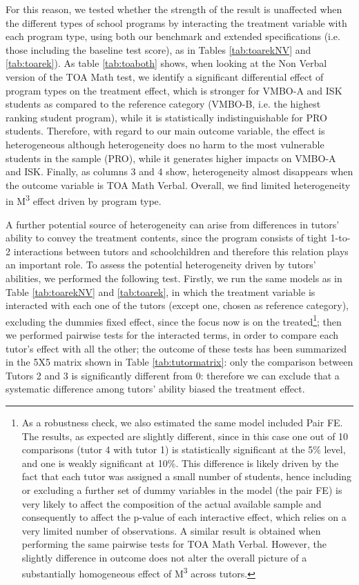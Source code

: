 \documentclass[ 12 pt]{article}
\begin{document}
For this reason, we tested whether the strength of the result is unaffected when the different types of school programs by interacting the treatment variable with each program type, using both our benchmark and extended specifications (i.e. those including the baseline test score), as in Tables \ref{tab:toarekNV} and \ref{tab:toarek}).
As table \ref{tab:toaboth} shows, when looking at the Non Verbal version of the TOA Math test, we identify a significant differential effect of program types on the treatment effect, which is stronger for VMBO-A and ISK students as compared to the reference category (VMBO-B, i.e. the highest ranking student program), while it is statistically indistinguishable for PRO students. Therefore, with regard to our main outcome variable, the effect is heterogeneous although heterogeneity does no harm to the most vulnerable students in the sample (PRO), while it generates higher impacts on VMBO-A and ISK. Finally, as columns 3 and 4 show, heterogeneity almost disappears when the outcome variable is TOA Math Verbal. Overall, we find limited heterogeneity in M\textsuperscript{3} effect driven by program type.

\begin{landscape}

\end{landscape}

A further potential source of heterogeneity can arise from differences in tutors’ ability to convey the treatment contents, since the program consists of tight 1-to-2 interactions between tutors and schoolchildren and therefore this relation plays an important role. 
To assess the potential heterogeneity driven by tutors' abilities, we performed the following test. Firstly, we run the same models as in Table \ref{tab:toarekNV} and \ref{tab:toarek}, in which the treatment variable is interacted with each one of the tutors (except one, chosen as reference category), excluding the dummies fixed effect, since the focus now is on the treated\footnote{As a robustness check, we also estimated the same model included Pair FE. The results, as expected are slightly different, since in this case one out of 10 comparisons (tutor 4 with tutor 1) is statistically significant at the 5\% level, and one is weakly significant at 10\%. This difference is likely driven by the fact that each tutor was assigned a small number of students, hence including or excluding a further set of dummy variables in the model (the pair FE) is very likely to affect the composition of the actual available sample and consequently to affect the p-value of each interactive effect, which relies on a very limited number of observations. A similar result is obtained when performing the same pairwise tests for TOA Math Verbal. However, the slightly difference in outcome does not alter the overall picture of a substantially homogeneous effect of M\textsuperscript{3} across tutors.}; then we performed pairwise tests for the interacted terms, in order to compare each tutor's effect with all the other; the outcome of these tests has been summarized in the 5X5 matrix shown in Table \ref{tab:tutormatrix}: only the comparison between Tutors 2 and 3 is significantly different from 0: therefore we can exclude that a systematic difference among tutors' ability biased the treatment effect.
\end{document}
